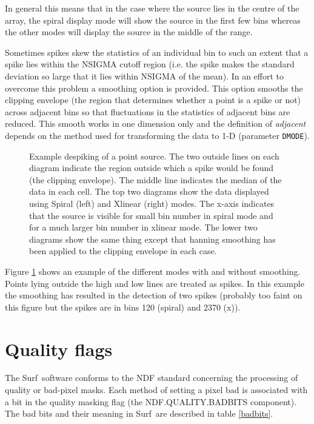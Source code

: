 \documentclass[twoside,11pt]{article}
\newcommand{\scusoft}          {{\sc Surf}}
\newcommand{\param}[1]{{\tt #1}}
\newcommand{\xlabel}[1]{}
\begin{document}
In general this means that in the case where the source lies in the centre of
the array, the spiral display mode will show the source in the first
few bins whereas the other modes will display the source in the middle of
the range.

Sometimes spikes skew the statistics of an individual bin to such an extent
that a spike lies within the NSIGMA cutoff region (i.e. the spike makes the
standard deviation so large that it lies within NSIGMA of the mean). In an
effort to overcome this problem a smoothing option is provided. 
This option smooths the clipping envelope (the region that determines whether
a point is a spike or not) across adjacent bins so that fluctuations in the
statistics of adjacent bins are reduced. This smooth works in one dimension
only and the definition of \textit{adjacent} depends on the method used for
transforming the data to 1-D (parameter \param{DMODE}).

\begin{figure}
\begin{center}
\caption{Example despiking of a point source. The two outside lines on each
diagram indicate the region outside which a spike would be found (the clipping
envelope). The middle line indicates the median of the data in each cell.  The
top two diagrams show the data displayed using Spiral (left) and Xlinear
(right) modes. The x-axis indicates that the source is visible for small
bin number in spiral mode and for a much larger bin number in xlinear
mode. The lower two diagrams show the same thing except that hanning smoothing 
has been applied to the clipping envelope in each case. }
\label{fig:despike_eg}
\end{center}
\end{figure}

Figure \ref{fig:despike_eg} shows an example of the different modes with and
without smoothing. Points lying outside the high and low lines are treated as
spikes.  In this example the smoothing has resulted in the detection of two
spikes (probably too faint on this figure but the spikes are in bins 120
(spiral) and 2370 (x)).

  




\section{\xlabel{quality}Quality flags\label{quality}}

The \scusoft\ software conforms to the NDF standard concerning the processing
of quality or bad-pixel masks. Each method of setting a pixel bad is
associated with a bit in the quality masking flag (the NDF.QUALITY.BADBITS
component). The bad bits and their meaning in \scusoft\ are described in table
\ref{badbits}.
\end{document}

